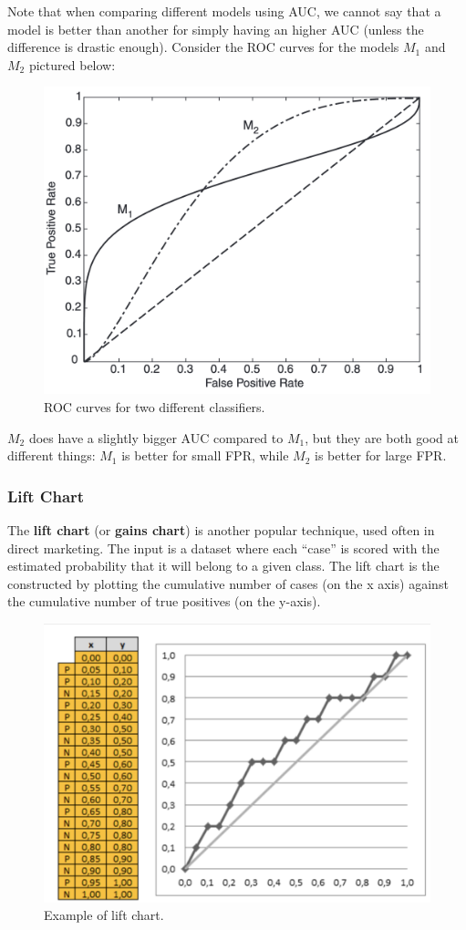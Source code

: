 Note that when comparing different models using AUC, we cannot say that a model is better than another for simply having an higher AUC (unless the difference is drastic enough). Consider the ROC curves for the models $M_1$ and $M_2$ pictured below:

\begin{figure}[ht]
    \centering
    \includegraphics[width=0.5\linewidth]{img/ROC_comparison.png}
    \caption{ROC curves for two different classifiers.}
\end{figure}

$M_2$ does have a slightly bigger AUC compared to $M_1$, but they are both good at different things: $M_1$ is better for small FPR, while $M_2$ is better for large FPR.

\subsubsection{Lift Chart}

The \textbf{lift chart} (or \textbf{gains chart}) is another popular technique, used often in direct marketing. The input is a dataset where each ``case'' is scored with the estimated probability that it will belong to a given class. The lift chart is the constructed by plotting the cumulative number of cases (on the x axis) against the cumulative number of true positives (on the y-axis). 

\begin{figure}[ht]
    \centering
    \includegraphics[width=0.5\linewidth]{img/Lift chart.png}
    \caption{Example of lift chart.}
\end{figure}

